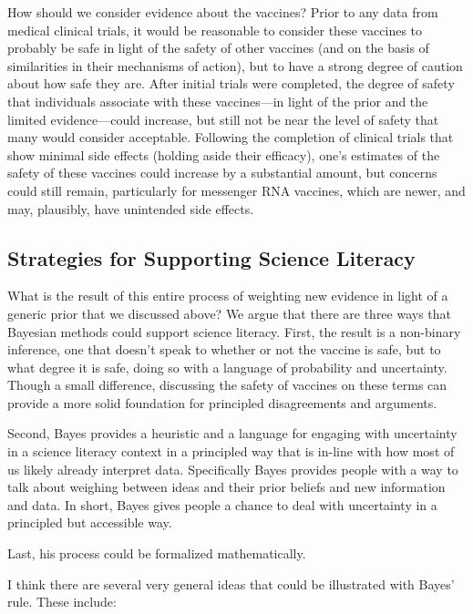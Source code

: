 \documentclass[man]{apa7}
\begin{document}
How should we consider evidence about the vaccines? Prior to any data from medical clinical trials, it would be reasonable to consider these vaccines to probably be safe in light of the safety of other vaccines (and on the basis of similarities in their mechanisms of action), but to have a strong degree of caution about how safe they are. After initial trials were completed, the degree of safety that individuals associate with these vaccines—in light of the prior and the limited evidence—could increase, but still not be near the level of safety that many would consider acceptable. Following the completion of clinical trials that show minimal side effects (holding aside their efficacy), one’s estimates of the safety of these vaccines could increase by a substantial amount, but concerns could still remain, particularly for messenger RNA vaccines, which are newer, and may, plausibly, have unintended side effects.

\subsection{Strategies for Supporting Science Literacy}

What is the result of this entire process of weighting new evidence in light of a generic prior that we discussed above? We argue that there are three ways that Bayesian methods could support science literacy. 
First, the result is a non-binary inference, one that doesn’t speak to whether or not the vaccine is safe, but to what degree it is safe, doing so with a language of probability and uncertainty. Though a small difference, discussing the safety of vaccines on these terms can provide a more solid foundation for principled disagreements and arguments.

Second, Bayes provides a heuristic and a language for engaging with uncertainty in a science literacy context in a principled way that is in-line with how most of us likely already interpret data. Specifically Bayes provides people with a way to talk about weighing between ideas and their prior beliefs and new information and data. In short, Bayes gives people a chance to deal with uncertainty in a principled but accessible way.

Last, his process could be formalized mathematically.

I think there are several very general ideas that could be illustrated with Bayes’ rule. These include:
\end{document}
